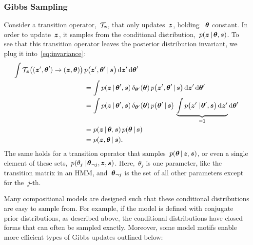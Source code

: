 \subsubsection{Gibbs Sampling}
Consider a transition operator,~$\mathcal{T}_{\boldsymbol{z}}$, that only updates~$\boldsymbol{z}$,
holding ~$\boldsymbol{\theta}$ constant. In order to update~$\boldsymbol{z}$, it samples from
the conditional distribution,~$p(\boldsymbol{z} \,|\, \boldsymbol{\theta}, \boldsymbol{s})$. To see
that this transition operator leaves the posterior distribution
invariant, we plug it into~\eqref{eq:invariance}:
\begin{align*}
  \int \mathcal{T}_{\boldsymbol{z}} \big((\boldsymbol{z}', \boldsymbol{\theta}') \to (\boldsymbol{z}, \boldsymbol{\theta}) \big) \, 
    &p \big(\boldsymbol{z}', \boldsymbol{\theta}' \,|\, \boldsymbol{s} \big) \, 
    \mathrm{d}\boldsymbol{z}' \, \mathrm{d}\boldsymbol{\theta}' \\
  &= \int p(\boldsymbol{z} \,|\, \boldsymbol{\theta}', \boldsymbol{s}) \, \delta_{\boldsymbol{\theta}'}(\boldsymbol{\theta}) \,
    p \big(\boldsymbol{z}', \boldsymbol{\theta}' \,|\, \boldsymbol{s} \big) \, 
    \mathrm{d}\boldsymbol{z}' \, \mathrm{d}\boldsymbol{\theta}' \\
  &= 
  \int p(\boldsymbol{z} \,|\, \boldsymbol{\theta}', \boldsymbol{s}) \, \delta_{\boldsymbol{\theta}'}(\boldsymbol{\theta}) \,
    p \big(\boldsymbol{\theta}' \,|\, \boldsymbol{s} \big) \,
     \underbrace{\int
    p \big(\boldsymbol{z}' \,|\, \boldsymbol{\theta}', \boldsymbol{s} \big) \, 
    \mathrm{d}\boldsymbol{z}'}_{=1}  \mathrm{d}\boldsymbol{\theta}' \\
  &= p(\boldsymbol{z} \,|\, \boldsymbol{\theta}, \boldsymbol{s}) \, p(\boldsymbol{\theta} \,|\, \boldsymbol{s}) \\
  &= p(\boldsymbol{z}, \boldsymbol{\theta} \,|\, \boldsymbol{s}).
\end{align*}
The same holds for a transition operator that
samples~${p(\boldsymbol{\theta} \,|\, \boldsymbol{z}, \boldsymbol{s})}$, or even a single element of these
sets,~${p(\theta_j \,|\, \boldsymbol{\theta}_{\neg j}, \boldsymbol{z}, \boldsymbol{s})}$.
Here,~$\theta_j$ is one parameter, like the transition matrix in an
HMM, and~$\boldsymbol{\theta}_{\neg j}$ is the set of all other parameters except
for the~$j$-th.

Many compositional models are designed such that these conditional
distributions are easy to sample from. For example, if the
model is defined with conjugate prior distributions, as described
above, the conditional distributions have closed forms that can
often be sampled exactly. Moreover, some model motifs enable more
efficient types of Gibbs updates outlined below:


